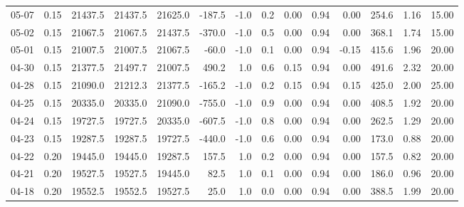 \begin{threeparttable}
{\begin{tabular}{lrrrrrrrrrrrrr}
  05-07 &     0.15 & 21437.5 & 21437.5 & 21625.0 &     -187.5 &                     -1.0 &                 0.2 &       0.00 &      0.94 &           0.00 &            254.6 &            1.16 &                  15.00 \\
  05-02 &     0.15 & 21067.5 & 21067.5 & 21437.5 &     -370.0 &                     -1.0 &                 0.5 &       0.00 &      0.94 &           0.00 &            368.1 &            1.74 &                  15.00 \\
  05-01 &     0.15 & 21007.5 & 21007.5 & 21067.5 &      -60.0 &                     -1.0 &                 0.1 &       0.00 &      0.94 &          -0.15 &            415.6 &            1.96 &                  20.00 \\
  04-30 &     0.15 & 21377.5 & 21497.7 & 21007.5 &      490.2 &                      1.0 &                 0.6 &       0.15 &      0.94 &           0.00 &            491.6 &            2.32 &                  20.00 \\
  04-28 &     0.15 & 21090.0 & 21212.3 & 21377.5 &     -165.2 &                     -1.0 &                 0.2 &       0.15 &      0.94 &           0.15 &            425.0 &            2.00 &                  25.00 \\
  04-25 &     0.15 & 20335.0 & 20335.0 & 21090.0 &     -755.0 &                     -1.0 &                 0.9 &       0.00 &      0.94 &           0.00 &            408.5 &            1.92 &                  20.00 \\
  04-24 &     0.15 & 19727.5 & 19727.5 & 20335.0 &     -607.5 &                     -1.0 &                 0.8 &       0.00 &      0.94 &           0.00 &            262.5 &            1.29 &                  20.00 \\
  04-23 &     0.15 & 19287.5 & 19287.5 & 19727.5 &     -440.0 &                     -1.0 &                 0.6 &       0.00 &      0.94 &           0.00 &            173.0 &            0.88 &                  20.00 \\
  04-22 &     0.20 & 19445.0 & 19445.0 & 19287.5 &      157.5 &                      1.0 &                 0.2 &       0.00 &      0.94 &           0.00 &            157.5 &            0.82 &                  20.00 \\
  04-21 &     0.20 & 19527.5 & 19527.5 & 19445.0 &       82.5 &                      1.0 &                 0.1 &       0.00 &      0.94 &           0.00 &            186.0 &            0.96 &                  20.00 \\
  04-18 &     0.20 & 19552.5 & 19552.5 & 19527.5 &       25.0 &                      1.0 &                 0.0 &       0.00 &      0.94 &           0.00 &            388.5 &            1.99 &                  20.00 \\

\end{tabular}}
\end{threeparttable}
